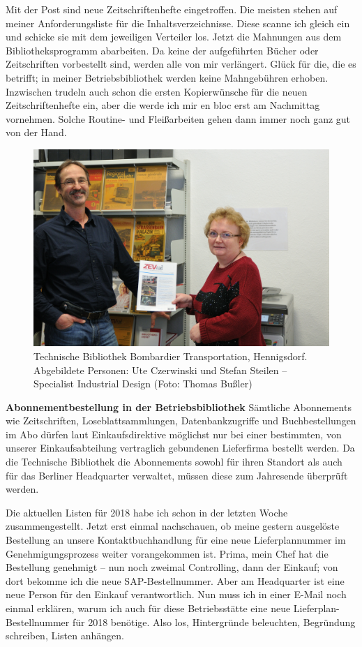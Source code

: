 \documentclass[a4paper,
fontsize=11pt,
oneside,
numbers=noperiodatend,
parskip=half-,
bibliography=totoc,
final
]{scrartcl}
\begin{document}
Mit der Post sind neue Zeitschriftenhefte eingetroffen. Die meisten
stehen auf meiner Anforderungsliste für die Inhaltsverzeichnisse. Diese
scanne ich gleich ein und schicke sie mit dem jeweiligen Verteiler los.
Jetzt die Mahnungen aus dem Bibliotheksprogramm abarbeiten. Da keine der
aufgeführten Bücher oder Zeitschriften vorbestellt sind, werden alle von
mir verlängert. Glück für die, die es betrifft; in meiner
Betriebsbibliothek werden keine Mahngebühren erhoben. Inzwischen trudeln
auch schon die ersten Kopierwünsche für die neuen Zeitschriftenhefte
ein, aber die werde ich mir en bloc erst am Nachmittag vornehmen. Solche
Routine- und Fleißarbeiten gehen dann immer noch ganz gut von der Hand.

\begin{figure}
\centering
\includegraphics{img/Czerwinski_1.jpg}
\caption{Technische Bibliothek Bombardier Transportation, Hennigsdorf.
Abgebildete Personen: Ute Czerwinski und Stefan Steilen -- Specialist
Industrial Design (Foto: Thomas Bußler)}
\end{figure}

\textbf{Abonnementbestellung in der Betriebsbibliothek} Sämtliche
Abonnements wie Zeitschriften, Loseblattsammlungen, Datenbankzugriffe
und Buchbestellungen im Abo dürfen laut Einkaufsdirektive möglichst nur
bei einer bestimmten, von unserer Einkaufsabteilung vertraglich
gebundenen Lieferfirma bestellt werden. Da die Technische Bibliothek die
Abonnements sowohl für ihren Standort als auch für das Berliner
Headquarter verwaltet, müssen diese zum Jahresende überprüft werden.

Die aktuellen Listen für 2018 habe ich schon in der letzten Woche
zusammengestellt. Jetzt erst einmal nachschauen, ob meine gestern
ausgelöste Bestellung an unsere Kontaktbuchhandlung für eine neue
Lieferplannummer im Genehmigungsprozess weiter vorangekommen ist. Prima,
mein Chef hat die Bestellung genehmigt -- nun noch zweimal Controlling,
dann der Einkauf; von dort bekomme ich die neue SAP-Bestellnummer. Aber
am Headquarter ist eine neue Person für den Einkauf verantwortlich. Nun
muss ich in einer E-Mail noch einmal erklären, warum ich auch für diese
Betriebsstätte eine neue Lieferplan-Bestellnummer für 2018 benötige.
Also los, Hintergründe beleuchten, Begründung schreiben, Listen
anhängen.
\end{document}
